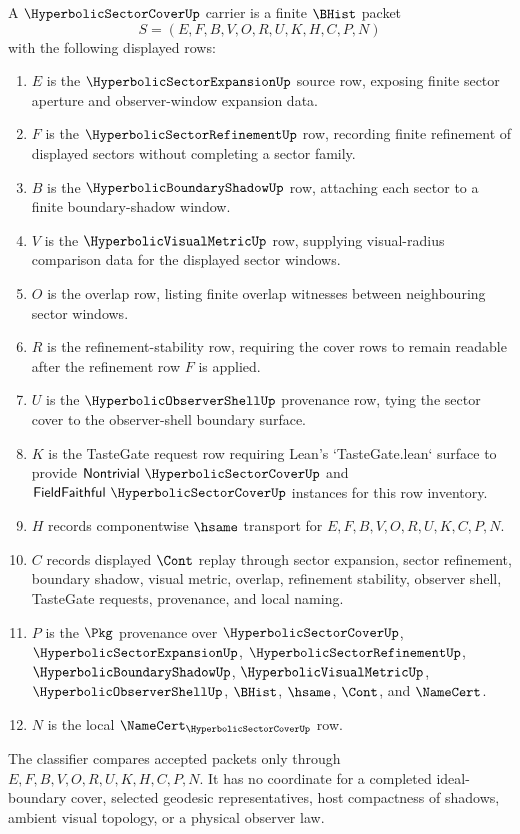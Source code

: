 \begin{definition}
\label{def:hyperbolic-sector-cover-carrier}
A $\HyperbolicSectorCoverUp$ carrier is a finite $\BHist$ packet
$$
S=(E,F,B,V,O,R,U,K,H,C,P,N)
$$
with the following displayed rows:
\begin{enumerate}
\item $E$ is the $\HyperbolicSectorExpansionUp$ source row, exposing finite sector aperture and observer-window expansion data.
\item $F$ is the $\HyperbolicSectorRefinementUp$ row, recording finite refinement of displayed sectors without completing a sector family.
\item $B$ is the $\HyperbolicBoundaryShadowUp$ row, attaching each sector to a finite boundary-shadow window.
\item $V$ is the $\HyperbolicVisualMetricUp$ row, supplying visual-radius comparison data for the displayed sector windows.
\item $O$ is the overlap row, listing finite overlap witnesses between neighbouring sector windows.
\item $R$ is the refinement-stability row, requiring the cover rows to remain readable after the refinement row $F$ is applied.
\item $U$ is the $\HyperbolicObserverShellUp$ provenance row, tying the sector cover to the observer-shell boundary surface.
\item $K$ is the TasteGate request row requiring Lean's `TasteGate.lean` surface to provide $\mathsf{Nontrivial}\ \HyperbolicSectorCoverUp$ and $\mathsf{FieldFaithful}\ \HyperbolicSectorCoverUp$ instances for this row inventory.
\item $H$ records componentwise $\hsame$ transport for $E,F,B,V,O,R,U,K,C,P,N$.
\item $C$ records displayed $\Cont$ replay through sector expansion, sector refinement, boundary shadow, visual metric, overlap, refinement stability, observer shell, TasteGate requests, provenance, and local naming.
\item $P$ is the $\Pkg$ provenance over $\HyperbolicSectorCoverUp$, $\HyperbolicSectorExpansionUp$, $\HyperbolicSectorRefinementUp$, $\HyperbolicBoundaryShadowUp$, $\HyperbolicVisualMetricUp$, $\HyperbolicObserverShellUp$, $\BHist$, $\hsame$, $\Cont$, and $\NameCert$.
\item $N$ is the local $\NameCert_{\HyperbolicSectorCoverUp}$ row.
\end{enumerate}
The classifier compares accepted packets only through $E,F,B,V,O,R,U,K,H,C,P,N$. It has no coordinate for a completed ideal-boundary cover, selected geodesic representatives, host compactness of shadows, ambient visual topology, or a physical observer law.
\end{definition}

